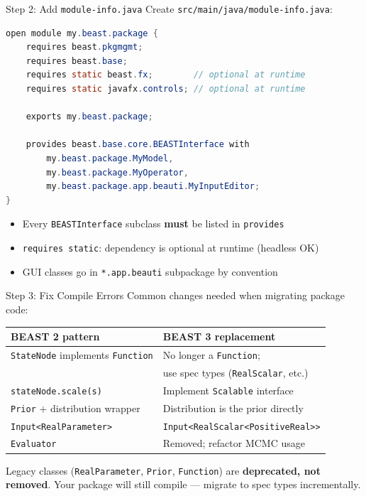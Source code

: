 \documentclass[aspectratio=169,11pt]{beamer}
\newcommand{\code}[1]{\texttt{#1}}
\begin{document}
\begin{frame}[fragile]{Step 2: Add \code{module-info.java}}
Create \code{src/main/java/module-info.java}:

\begin{lstlisting}[language=Java]
open module my.beast.package {
    requires beast.pkgmgmt;
    requires beast.base;
    requires static beast.fx;        // optional at runtime
    requires static javafx.controls; // optional at runtime

    exports my.beast.package;

    provides beast.base.core.BEASTInterface with
        my.beast.package.MyModel,
        my.beast.package.MyOperator,
        my.beast.package.app.beauti.MyInputEditor;
}
\end{lstlisting}

\begin{itemize}
\item Every \code{BEASTInterface} subclass \textbf{must} be listed in \code{provides}
\item \code{requires static}: dependency is optional at runtime (headless OK)
\item GUI classes go in \code{*.app.beauti} subpackage by convention
\end{itemize}
\end{frame}


\begin{frame}{Step 3: Fix Compile Errors}
Common changes needed when migrating package code:

\vspace{0.5em}
\begin{center}
\small
\begin{tabular}{ll}
\toprule
\textbf{BEAST 2 pattern} & \textbf{BEAST 3 replacement} \\
\midrule
\code{StateNode} implements \code{Function} & No longer a \code{Function}; \\
& use spec types (\code{RealScalar}, etc.) \\
\code{stateNode.scale(s)} & Implement \code{Scalable} interface \\
\code{Prior} + distribution wrapper & Distribution is the prior directly \\
\code{Input<RealParameter>} & \code{Input<RealScalar<PositiveReal>{}>} \\
\code{Evaluator} & Removed; refactor MCMC usage \\
\bottomrule
\end{tabular}
\end{center}

\vspace{0.5em}
\begin{block}{}
Legacy classes (\code{RealParameter}, \code{Prior}, \code{Function}) are \textbf{deprecated, not removed}. Your package will still compile --- migrate to spec types incrementally.
\end{block}
\end{frame}
\end{document}
